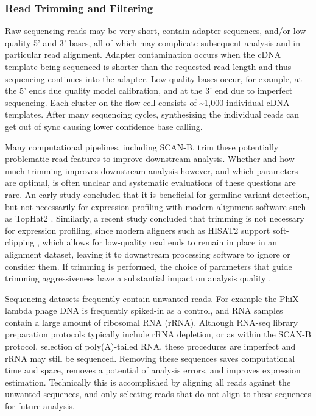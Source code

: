 \documentclass[11pt]{book}
\newcommand{\scanb}{\mbox{SCAN-B}}
\begin{document}
\subsubsection*{Read Trimming and Filtering}

Raw sequencing reads may be very short, contain adapter sequences, and/or low quality 5' and 3' bases, all of which may complicate subsequent analysis and in particular read alignment. Adapter contamination occurs when the cDNA template being sequenced is shorter than the requested read length and thus sequencing continues into the adapter. Low quality bases occur, for example, at the 5' ends due quality model calibration, and at the 3' end due to imperfect sequencing. Each cluster on the flow cell consists of \textasciitilde1,000 individual cDNA templates. After many sequencing cycles, synthesizing the individual reads can get out of sync causing lower confidence base calling.

Many computational pipelines, including \scanb{}, trim these potentially problematic read features to improve downstream analysis. Whether and how much trimming improves downstream analysis however, and which parameters are optimal, is often unclear and systematic evaluations of these questions are rare. An early study concluded that it is beneficial for germline variant detection, but not necessarily for expression profiling with modern alignment software such as TopHat2 \cite{DelFabbro:2013}. Similarly, a recent study concluded that trimming is not necessary for expression profiling, since modern aligners such as HISAT2 support soft-clipping \cite{Liao:2020}, which allows for low-quality read ends to remain in place in an alignment dataset, leaving it to downstream processing software to ignore or consider them. If trimming is performed, the choice of parameters that guide trimming aggressiveness have a substantial impact on analysis quality \cite{MacManes:2014}.

Sequencing datasets frequently contain unwanted reads. For example the PhiX lambda phage DNA is frequently spiked-in as a control, and RNA samples contain a large amount of ribosomal RNA (rRNA). Although RNA-seq library preparation protocols typically include rRNA depletion, or as within the \scanb{} protocol, selection of poly(A)-tailed RNA, these procedures are imperfect and rRNA may still be sequenced. Removing these sequences saves computational time and space, removes a potential of analysis errors, and improves expression estimation. Technically this is accomplished by aligning all reads against the unwanted sequences, and only selecting reads that do not align to these sequences for future analysis.
\end{document}
